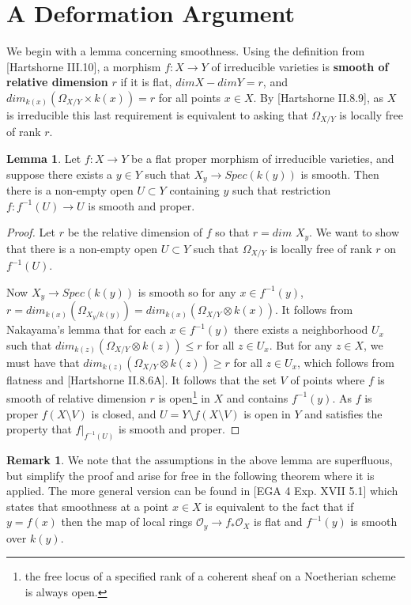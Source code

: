 \documentclass{ucbthesis}
\theoremstyle{definition}
\newtheorem{rmk}[thm]{Remark}
\theoremstyle{theorem}
\newtheorem{lem}[thm]{Lemma}
\begin{document}
\section{A Deformation Argument}
We begin with a lemma concerning smoothness. Using the definition from [Hartshorne III.10], a morphism
 $f:X\rightarrow Y$ of irreducible varieties is \textbf{smooth of relative dimension} $r$ if it is flat,
  $dimX-dimY =r$, and $dim_{k(x)}(\Omega_{X/Y} \times k(x)) = r$ for all points $x\in X$. By 
  [Hartshorne II.8.9], as $X$ is irreducible this last requirement is equivalent to asking that $\Omega_{X/Y}$ is locally free of rank $r$. 

\begin{lem}
Let $f:X\rightarrow Y$ be a flat proper morphism of irreducible varieties, and suppose there exists a $y\in Y$ such that $X_{y}\rightarrow Spec(k(y))$ is smooth. Then there is a non-empty open $U\subset Y$ containing $y$ such that restriction $f : f^{-1}(U)\rightarrow U$ is smooth and proper. 
\end{lem}
\begin{proof}


Let $r$ be the relative dimension of $f$ so that $r = dim$ $X_{y}$. We want to show that there is a non-empty open $U\subset Y$ such that $\Omega_{X/Y}$ is locally free of rank $r$ on $f^{-1}(U)$. 

Now $X_{y} \rightarrow Spec(k(y))$ is smooth so for any $x\in f^{-1}(y)$, $r = dim_{k(x)}(\Omega_{X_{y}/k(y)}) = dim_{k(x)}(\Omega_{X/Y}\otimes k(x))$. It follows from Nakayama's lemma that for each $x\in f^{-1}(y)$  there exists a neighborhood $U_{x}$ such that $dim_{k(z)}(\Omega_{X/Y}\otimes k(z)) \leq r$  for all $z \in U_{x}$. But for any $z\in X$, we must have that $dim_{k(z)}(\Omega_{X/Y}\otimes k(z)) \geq r$  for all $z \in U_{x}$, which follows from flatness and [Hartshorne II.8.6A]. It follows that the set $V$ of points where $f$ is smooth of relative dimension $r$ is open\footnote{the free locus of a specified rank of a coherent sheaf on a Noetherian scheme is always open.} in $X$ and contains $f^{-1}(y)$. As $f$ is proper $f(X\setminus V)$ is closed, and $U = Y\setminus f(X\setminus V)$ is open in $Y$ and satisfies the property that $f|_{f^{-1}(U)}$ is smooth and proper. 
\end{proof}

\begin{rmk}
We note that the assumptions in the above lemma are superfluous, but simplify the proof and arise for free in the following theorem where it is applied. The more general version can be found in [EGA 4 Exp. XVII 5.1] which states that smoothness at a point $x\in X$ is equivalent to the fact that if $y=f(x)$ then the map of local rings $\mathcal{O}_{y} \rightarrow f_{*}\mathcal{O}_{X}$ is flat and $f^{-1}(y)$ is smooth over $k(y)$. 
\end{rmk}
\end{document}
